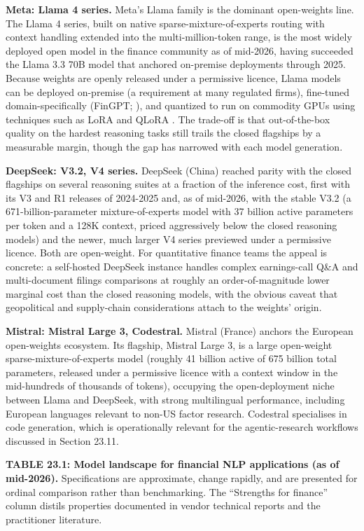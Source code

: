 \textbf{Meta: Llama 4 series.} Meta's Llama family is the dominant open-weights line. The Llama 4 series, built on native sparse-mixture-of-experts routing with context handling extended into the multi-million-token range, is the most widely deployed open model in the finance community as of mid-2026, having succeeded the Llama 3.3 70B model that anchored on-premise deployments through 2025. Because weights are openly released under a permissive licence, Llama models can be deployed on-premise (a requirement at many regulated firms), fine-tuned domain-specifically (FinGPT; \citep{yang2023fingpt}), and quantized to run on commodity GPUs using techniques such as LoRA \citep{hu2022lora} and QLoRA \citep{dettmers2023qlora}. The trade-off is that out-of-the-box quality on the hardest reasoning tasks still trails the closed flagships by a measurable margin, though the gap has narrowed with each model generation.

\textbf{DeepSeek: V3.2, V4 series.} DeepSeek (China) reached parity with the closed flagships on several reasoning suites at a fraction of the inference cost, first with its V3 and R1 releases of 2024-2025 and, as of mid-2026, with the stable V3.2 (a 671-billion-parameter mixture-of-experts model with 37 billion active parameters per token and a 128K context, priced aggressively below the closed reasoning models) and the newer, much larger V4 series previewed under a permissive licence. Both are open-weight. For quantitative finance teams the appeal is concrete: a self-hosted DeepSeek instance handles complex earnings-call Q\&A and multi-document filings comparisons at roughly an order-of-magnitude lower marginal cost than the closed reasoning models, with the obvious caveat that geopolitical and supply-chain considerations attach to the weights' origin.

\textbf{Mistral: Mistral Large 3, Codestral.} Mistral (France) anchors the European open-weights ecosystem. Its flagship, Mistral Large 3, is a large open-weight sparse-mixture-of-experts model (roughly 41 billion active of 675 billion total parameters, released under a permissive licence with a context window in the mid-hundreds of thousands of tokens), occupying the open-deployment niche between Llama and DeepSeek, with strong multilingual performance, including European languages relevant to non-US factor research. Codestral specialises in code generation, which is operationally relevant for the agentic-research workflows discussed in Section 23.11.

\textbf{TABLE 23.1: Model landscape for financial NLP applications (as of mid-2026).} Specifications are approximate, change rapidly, and are presented for ordinal comparison rather than benchmarking. The ``Strengths for finance'' column distils properties documented in vendor technical reports and the practitioner literature.

